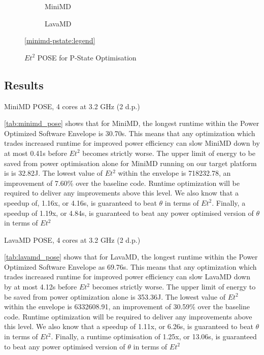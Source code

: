 \begin{figure}[t]%
\begin{subfigure}[t]{.5\linewidth}%
\centering%
%
\caption{MiniMD}%
\end{subfigure}%
\begin{subfigure}[t]{.5\linewidth}%
%
\caption{LavaMD}%
\end{subfigure}%
\begin{center}%
\ref{minimd-pstate:legend}%
\end{center}%
\caption{$Et^2$ POSE for P-State Optimisation}%
\label{fig:pstates}%
\end{figure}%

\subsection{Results}

\begin{table}
\centering
\caption{MiniMD POSE, 4 cores at 3.2 GHz (2 d.p.)}

\label{tab:minimd_pose}
\end{table} 

\autoref{tab:minimd_pose} shows that for MiniMD, the longest runtime within the Power Optimized Software Envelope is 30.70s.
This means that any optimization which trades increased runtime for improved power efficiency can slow MiniMD down by at most 0.41s before $Et^2$ becomes strictly worse.
The upper limit of energy to be saved from power optimisation alone for MiniMD running on our target platform is is 32.82J.
The lowest value of $Et^2$ within the envelope is 718232.78, an improvement of 7.60\% over the baseline code. 
Runtime optimization will be required to deliver any improvements above this level.
We also know that a speedup of, 1.16x, or 4.16s, is guaranteed to beat $\theta$ in terms of $Et^2$.
Finally, a speedup of 1.19x, or 4.84s, is guaranteed to beat any power optimised version of $\theta$ in terms of $Et^2$

\begin{table}
\centering
\caption{LavaMD POSE, 4 cores at 3.2 GHz (2 d.p.)}

\label{tab:lavamd_pose}
\end{table} 

\autoref{tab:lavamd_pose} shows that for LavaMD, the longest runtime within the Power Optimized Software Envelope as 69.76s.
This means that any optimization which trades increased runtime for improved power efficiency can slow LavaMD down by at most 4.12s before $Et^2$ becomes strictly worse.
The upper limit of energy to be saved from power optimization alone is 353.36J.
The lowest value of $Et^2$ within the envelope is 6332608.91, an improvement of 30.59\% over the baseline code.
Runtime optimization will be required to deliver any improvements above this level.
We also know that a speedup of 1.11x, or 6.26s, is guaranteed to beat $\theta$ in terms of $Et^2$.
Finally, a runtime optimisation of 1.25x, or 13.06s, is guaranteed to beat any power optimised version of $\theta$ in terms of $Et^2$ 

